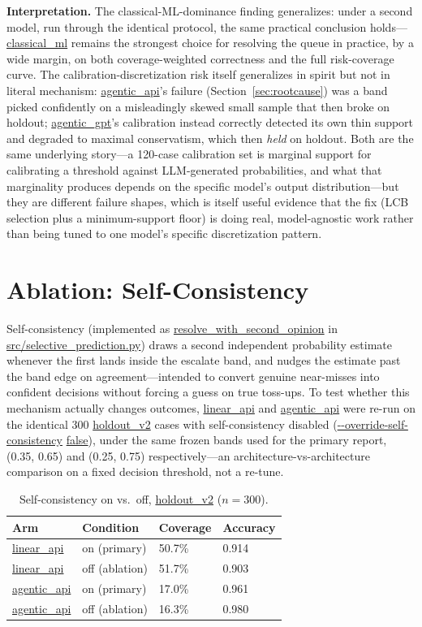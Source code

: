 \documentclass[]{ieeeaccess}
\newcommand{\code}[1]{\url{#1}}
\begin{document}
\textbf{Interpretation.} The classical-ML-dominance finding generalizes:
under a second model, run through the identical protocol, the same
practical conclusion holds---\code{classical_ml} remains the strongest
choice for resolving the queue in practice, by a wide margin, on both
coverage-weighted correctness and the full risk-coverage curve. The
calibration-discretization risk itself generalizes in spirit but not in
literal mechanism: \code{agentic_api}'s failure (Section~\ref{sec:rootcause}) was a band
picked confidently on a misleadingly skewed small sample that then broke
on holdout; \code{agentic_gpt}'s calibration instead correctly detected
its own thin support and degraded to maximal conservatism, which then
\textit{held} on holdout. Both are the same underlying story---a
120-case calibration set is marginal support for calibrating a threshold
against LLM-generated probabilities, and what that marginality produces
depends on the specific model's output distribution---but they are
different failure shapes, which is itself useful evidence that the fix
(LCB selection plus a minimum-support floor) is doing real,
model-agnostic work rather than being tuned to one model's specific
discretization pattern.

\section{Ablation: Self-Consistency}\label{sec:ablation}

Self-consistency (implemented as \code{resolve_with_second_opinion} in
\code{src/selective_prediction.py}) draws a second independent
probability estimate whenever the first lands inside the escalate band,
and nudges the estimate past the band edge on agreement---intended to
convert genuine near-misses into confident decisions without forcing a
guess on true toss-ups. To test whether this mechanism actually changes
outcomes, \code{linear_api} and \code{agentic_api} were re-run on the
identical 300 \code{holdout_v2} cases with self-consistency disabled
(\code{--override-self-consistency} \code{false}), under the same frozen bands
used for the primary report, (0.35, 0.65) and (0.25, 0.75)
respectively---an architecture-vs-architecture comparison on a fixed
decision threshold, not a re-tune.

\begin{table}[H]
\centering
\caption{Self-consistency on vs.\ off, \code{holdout_v2} ($n=300$).}\label{tab:sc}
\footnotesize
\begin{tabularx}{\columnwidth}{@{}lXYY@{}}
\toprule
\textbf{Arm} & \textbf{Condition} & \textbf{Coverage} & \textbf{Accuracy} \\
\midrule
\code{linear_api} & on (primary) & 50.7\% & 0.914 \\
\code{linear_api} & off (ablation) & 51.7\% & 0.903 \\
\code{agentic_api} & on (primary) & 17.0\% & 0.961 \\
\code{agentic_api} & off (ablation) & 16.3\% & 0.980 \\
\bottomrule
\end{tabularx}
\end{table}
\end{document}
